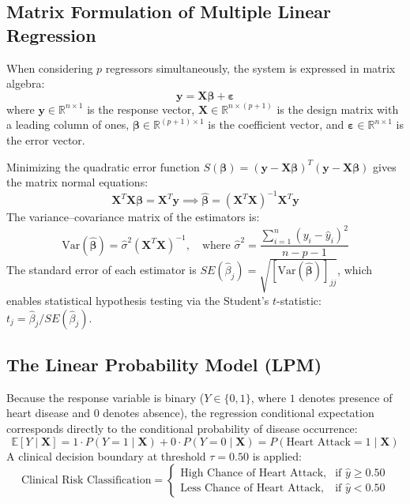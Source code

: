 \documentclass[12pt,a4paper]{article}
\begin{document}
\subsection{Matrix Formulation of Multiple Linear Regression}
When considering $p$ regressors simultaneously, the system is expressed in matrix algebra:
\begin{equation}
    \mathbf{y} = \mathbf{X} \boldsymbol{\beta} + \boldsymbol{\varepsilon}
\end{equation}
where $\mathbf{y} \in \mathbb{R}^{n \times 1}$ is the response vector, $\mathbf{X} \in \mathbb{R}^{n \times (p+1)}$ is the design matrix with a leading column of ones, $\boldsymbol{\beta} \in \mathbb{R}^{(p+1) \times 1}$ is the coefficient vector, and $\boldsymbol{\varepsilon} \in \mathbb{R}^{n \times 1}$ is the error vector.

Minimizing the quadratic error function $S(\boldsymbol{\beta}) = (\mathbf{y} - \mathbf{X}\boldsymbol{\beta})^T(\mathbf{y} - \mathbf{X}\boldsymbol{\beta})$ gives the matrix normal equations:
\begin{equation}
    \mathbf{X}^T \mathbf{X} \boldsymbol{\beta} = \mathbf{X}^T \mathbf{y} \implies \hat{\boldsymbol{\beta}} = (\mathbf{X}^T \mathbf{X})^{-1} \mathbf{X}^T \mathbf{y}
\end{equation}
The variance--covariance matrix of the estimators is:
\begin{equation}
    \text{Var}(\hat{\boldsymbol{\beta}}) = \hat{\sigma}^2 (\mathbf{X}^T \mathbf{X})^{-1}, \quad \text{where } \hat{\sigma}^2 = \frac{\sum_{i=1}^n (y_i - \hat{y}_i)^2}{n - p - 1}
\end{equation}
The standard error of each estimator is $SE(\hat{\beta}_j) = \sqrt{[\text{Var}(\hat{\boldsymbol{\beta}})]_{jj}}$, which enables statistical hypothesis testing via the Student's $t$-statistic: $t_j = \hat{\beta}_j / SE(\hat{\beta}_j)$.

\subsection{The Linear Probability Model (LPM)}
Because the response variable is binary ($Y \in \{0, 1\}$, where $1$ denotes presence of heart disease and $0$ denotes absence), the regression conditional expectation corresponds directly to the conditional probability of disease occurrence:
\begin{equation}
    \mathbb{E}[Y \mid \mathbf{X}] = 1 \cdot P(Y = 1 \mid \mathbf{X}) + 0 \cdot P(Y = 0 \mid \mathbf{X}) = P(\text{Heart Attack} = 1 \mid \mathbf{X})
\end{equation}
A clinical decision boundary at threshold $\tau = 0.50$ is applied:
\begin{equation}
    \text{Clinical Risk Classification} =
    \begin{cases}
        \text{High Chance of Heart Attack}, & \text{if } \hat{y} \ge 0.50 \\
        \text{Less Chance of Heart Attack}, & \text{if } \hat{y} < 0.50
    \end{cases}
\end{equation}
\end{document}
